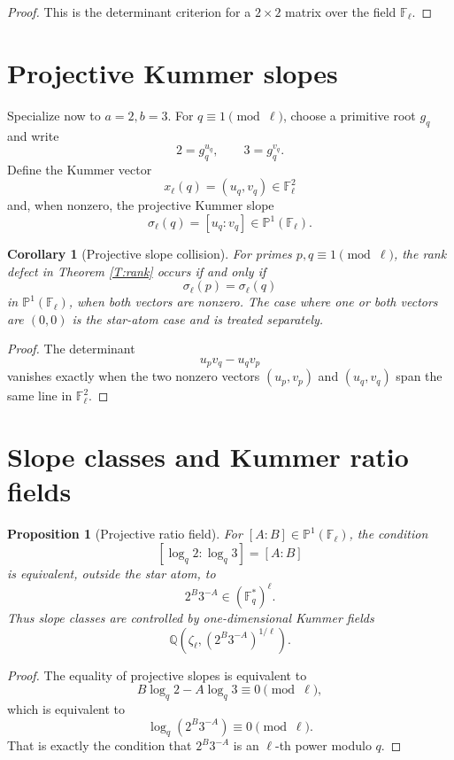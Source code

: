 \documentclass[11pt]{article}
\newtheorem{proposition}{Proposition}
\newtheorem{corollary}{Corollary}
\newcommand{\Q}{\mathbb Q}
\newcommand{\F}{\mathbb F}
\newcommand{\1}{\mathbf 1}
\begin{document}
\begin{proof}
This is the determinant criterion for a \(2\times2\) matrix over the field \(\F_\ell\).
\end{proof}

\section{Projective Kummer slopes}

Specialize now to \(a=2,b=3\).  For \(q\equiv1\pmod\ell\), choose a primitive root \(g_q\) and write
\[
2=g_q^{u_q},\qquad 3=g_q^{v_q}.
\]
Define the Kummer vector
\[
x_\ell(q)=(u_q,v_q)\in\F_\ell^2
\]
and, when nonzero, the projective Kummer slope
\[
\sigma_\ell(q)=[u_q:v_q]\in\mathbb P^1(\F_\ell).
\]

\begin{corollary}[Projective slope collision]\label{C:slope}
For primes \(p,q\equiv1\pmod\ell\), the rank defect in Theorem \ref{T:rank} occurs if and only if
\[
\sigma_\ell(p)=\sigma_\ell(q)
\]
in \(\mathbb P^1(\F_\ell)\), when both vectors are nonzero. The case where one or both vectors are \((0,0)\) is the star-atom case and is treated separately.
\end{corollary}

\begin{proof}
The determinant
\[
u_pv_q-u_qv_p
\]
vanishes exactly when the two nonzero vectors \((u_p,v_p)\) and \((u_q,v_q)\) span the same line in \(\F_\ell^2\).
\end{proof}

\section{Slope classes and Kummer ratio fields}

\begin{proposition}[Projective ratio field]\label{P:ratio}
For \([A:B]\in\mathbb P^1(\F_\ell)\), the condition
\[
[\log_q2:\log_q3]=[A:B]
\]
is equivalent, outside the star atom, to
\[
2^B3^{-A}\in(\F_q^*)^\ell.
\]
Thus slope classes are controlled by one-dimensional Kummer fields
\[
\Q(\zeta_\ell,(2^B3^{-A})^{1/\ell}).
\]
\end{proposition}

\begin{proof}
The equality of projective slopes is equivalent to
\[
B\log_q2-A\log_q3\equiv0\pmod\ell,
\]
which is equivalent to
\[
\log_q(2^B3^{-A})\equiv0\pmod\ell.
\]
That is exactly the condition that \(2^B3^{-A}\) is an \(\ell\)-th power modulo \(q\).
\end{proof}
\end{document}
